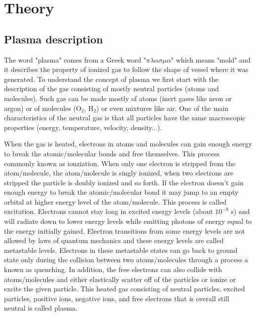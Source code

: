 \documentclass[12pt]{article}
\begin{document}
\section{Theory}

\subsection{Plasma description}
The word "plasma" comes from a Greek word "$\pi\lambda\alpha\sigma\mu\alpha$" which means "mold" and it describes the property of ionized gas to follow the shape of vessel where it was generated. To understand the concept of plasma we first start with the description of the gas consisting of mostly neutral particles (atoms and molecules). Such gas can be made mostly of atoms (inert gases like neon or argon) or of molecules (O$_2$, H$_2$) or even mixtures like air. One of the main characteristics of the neutral gas is that all particles have the same macroscopic properties (energy, temperature, velocity, density...).

When the gas is heated, electrons in atoms and molecules can gain enough energy to break the atomic/molecular bonds and free themselves. This process commonly known as ionziation. When only one electron is stripped from the atom/molecule, the atom/molecule is singly ionized, when two electrons are stripped the particle is doubly ionized and so forth. If the electron doesn't gain enough energy to break the atomic/molecular bond it may jump to an empty orbital at higher energy level of the atom/molecule. This process is called excitation. Electrons cannot stay long in excited energy levels (about $10^{-9}$ s) and will radiate down to lower energy levels while emitting photons of energy equal to the energy initially gained. Electron transitions from some energy levels are not allowed by laws of quantum mechanics and these energy levels are called metastable levels. Electrons in these metastable states can go back to ground state only during the collision between two atoms/molecules through a process a known as quenching. In addition, the free electrons can also collide with atoms/molecules and either elastically scatter off of the particles or ionize or excite the given particle. This heated gas consisting of neutral particles, excited particles, positive ions, negative ions, and free electrons that is overall still neutral is called plasma.
\end{document}

